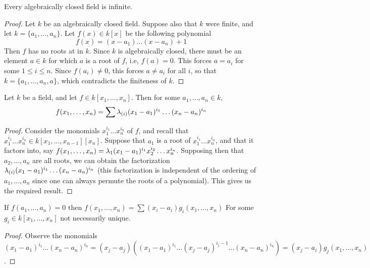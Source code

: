 \begin{lemma}\label{1.1.6}
    Every algebraically closed field is infinite.
\end{lemma}
\begin{proof}
    Let $k$ be an algebraically closed field. Suppose also that $k$ were finite,
    and let  $k=\{a_1, \dots, a_n\}$. Let $f(x) \in k[x]$ be the following
    polynomial
    \begin{equation*}
        f(x)=(x-a_1) \dots (x-a_n)+1
    \end{equation*}
    Then $f$ has no roots at in $k$. Since  $k$ is algebraically closed, there
    must be an element $a \in k$ for which $a$ is a root of $f$, i.e, $f(a)=0$.
    This forces $a=a_i$  for some $1 \leq i \leq n$. Since $f(a_i) \neq 0$, this
    forces $a \neq a_i$ for all $i$, so that $k=\{a_1, \dots, a_n,a\}$, which
    contradicts the finiteness of $k$.
\end{proof}

\begin{lemma}\label{1.1.7}
    Let $k$ be a field, and let $f \in k[x_1, \dots, x_n]$. Then for some $a_1,
    \dots, a_n \in k$,
    \begin{equation*}
        f(x_1,\dots,x_n)=\sum{\lambda_{(i)}(x_1-a_1)^{i_1} \dots (x_n-a_n)^{i_n}}
    \end{equation*}
\end{lemma}
\begin{proof}
    Consider the monomials $x_1^{i_1} \dots x_n^{i_n}$ of $f$, and recall that
    $x_1^{i_1} \dots x_n^{i_n} \in k[x_1, \dots, x_{n-1}][x_n]$. Suppose that
    $a_1$ is a root of $x_1^{i_1} \dots x_n^{i_n}$, and that it factors into,
    say $f(x_1, \dots, x_n)=\lambda_1(x_1-a_1)^{i_1} x_2^{i_2} \dots x_n^{i_n}$.
    Supposing then that $a_2, \dots, a_n$ are all roots, we can obtain the
    factorization $\lambda_{(i)}(x_1-a_1)^{i_1} \dots (x_n-a_n)^{i_n}$ (this
    factorization is independent of the ordering of $a_1, \dots, a_n$ since one
    can always permute the roots of a polynomial). This gives us the required
    result.
\end{proof}
\begin{corollary}
    If $f(a_1, \dots, a_n)=0$ then $f(x_1, \dots, x_n)=\sum{(x_i-a_i)g_i(x_1,
    \dots, x_n)}$ For some $g_i \in k[x_1, \dots, x_n]$ not necessarily unique.
\end{corollary}
\begin{proof}
    Observe the monomials $(x_1-a_1)^{i_1} \dots
    (x_n-a_n)^{i_n}=(x_j-a_j)((x_1-a_1)^{i_1} \dots (x_j-a_j)^{i_j-1} \dots
    (x_n-a_n)^{i_n})=(x_j-a_i)g_j(x_1, \dots, x_n)$.
\end{proof}

